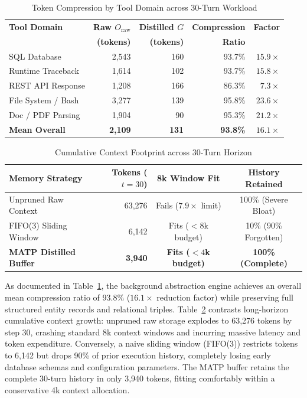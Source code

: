 \documentclass[lettersize,journal]{IEEEtran}
\begin{document}
\begin{table}[!t]
\caption{Token Compression by Tool Domain across 30-Turn Workload\label{tab:compression}}
\centering
{\small
\begin{tabular}{lrrrr}
\toprule
\textbf{Tool Domain} & \textbf{Raw $O_{\text{raw}}$} & \textbf{Distilled $G$} & \textbf{Compression} & \textbf{Factor} \\
 & \textbf{(tokens)} & \textbf{(tokens)} & \textbf{Ratio} & \\
\midrule
SQL Database       & 2,543 & 160 & 93.7\% & $15.9\times$ \\
Runtime Traceback  & 1,614 & 102 & 93.7\% & $15.8\times$ \\
REST API Response  & 1,208 & 166 & 86.3\% &  $7.3\times$ \\
File System / Bash & 3,277 & 139 & 95.8\% & $23.6\times$ \\
Doc / PDF Parsing  & 1,904 &  90 & 95.3\% & $21.2\times$ \\
\midrule
\textbf{Mean Overall} & \textbf{2,109} & \textbf{131} & \textbf{93.8\%} & $\mathbf{16.1\times}$ \\
\bottomrule
\end{tabular}
}
\end{table}

\begin{table}[!t]
\caption{Cumulative Context Footprint across 30-Turn Horizon\label{tab:context_growth}}
\centering
{\small
\begin{tabular}{lrcc}
\toprule
\textbf{Memory Strategy} & \textbf{Tokens ($t=30$)} & \textbf{8k Window Fit} & \textbf{History Retained} \\
\midrule
Unpruned Raw Context     & 63,276 & Fails ($7.9\times$ limit) & 100\% (Severe Bloat) \\
FIFO(3) Sliding Window   &  6,142 & Fits ($< 8$k budget)       & 10\% (90\% Forgotten) \\
\textbf{MATP Distilled Buffer} & \textbf{3,940} & \textbf{Fits ($< 4$k budget)} & \textbf{100\% (Complete)} \\
\bottomrule
\end{tabular}
}
\end{table}

As documented in Table~\ref{tab:compression}, the background abstraction engine achieves an overall mean compression ratio of 93.8\% ($16.1\times$ reduction factor) while preserving full structured entity records and relational triples. Table~\ref{tab:context_growth} contrasts long-horizon cumulative context growth: unpruned raw storage explodes to 63,276 tokens by step 30, crashing standard 8k context windows and incurring massive latency and token expenditure. Conversely, a naive sliding window (FIFO(3)) restricts tokens to 6,142 but drops 90\% of prior execution history, completely losing early database schemas and configuration parameters. The MATP buffer retains the complete 30-turn history in only 3,940 tokens, fitting comfortably within a conservative 4k context allocation.
\end{document}

